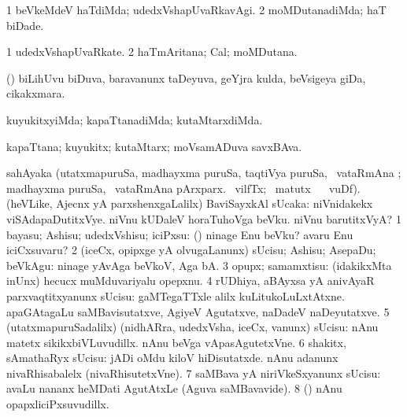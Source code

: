 {{{{{{\bentry
{}
  \gl{\kirxvi}\bmng
\bnum
\num{1} beVkeMdeV haTdiMda; udedxVshapUvaRkavAgi. 
\num{2} moMDutanadiMda; haT biDade. 
\enum
\emng
\eentry

\bentry
{}
  \gl{\nA}\bmng
\bnum
\num{1} udedxVshapUvaRkate. 
\num{2} haTmAritana; Cal; moMDutana. 
\enum
\emng
\eentry

\bentry
{} 
\gl{\nA}
\expl{}
\bmng
(\AseTxrXV) biLihUvu biDuva, baravanunx taDeyuva, geYjra kulda, beVsigeya giDa, cikakxmara. 
\emng
\eentry

\bentry
{}
  \gl{\kirxvi}\bmng
kuyukitxyiMda; kapaTtanadiMda; kutaMtarxdiMda. 
\emng
\eentry

\bentry
{}
  \gl{\nA}\bmng
kapaTtana; kuyukitx; kutaMtarx; moVsamADuva savxBAva. 
\emng
\eentry

\bentry
sahAyaka\gl{\kirx}
\bmng
(utatxmapuruSa, madhayxma puruSa, taqtiVya puruSa, \Eva\ vataRmAna ; madhayxma puruSa, \Eva\ vataRmAna pArxparx.  \ucAcx\ vilfTx; \BU\ matutx \BUkaq\  \ucAcx\ vuDf). (heVLike, Ajecnx yA parxshenxgaLalilx) BaviSayxkAl sUcaka:  niVnidakekx viSAdapaDutitxVye.  niVnu kUDaleV horaTuhoVga beVku.  niVnu barutitxVyA? 
\bnum
\num{1} bayasu; Ashisu; udedxVshisu; iciPxsu: (\pArxparx)  ninage Enu beVku?  avaru Enu iciCxsuvaru? 
\num{2} (iceCx, opipxge yA olvugaLanunx) sUcisu; Ashisu; AsepaDu; beVkAgu:  ninage yAvAga beVkoV, Aga bA. 
\num{3} opupx; samamxtisu:  (idakikxMta inUnx) hecucx muMduvariyalu opepxnu. 
\num{4} rUDhiya, aBAyxsa yA anivAyaR parxvaqtitxyanunx sUcisu:  gaMTegaTTxle alilx kuLitukoLuLxtAtxne.  apaGAtagaLu saMBavisutatxve, AgiyeV Agutatxve, naDadeV naDeyutatxve. 
\num{5} (utatxmapuruSadalilx) (nidhARra, udedxVsha, iceCx, \mo vanunx) sUcisu:  nAnu matetx sikikxbiVLuvudillx.  nAnu beVga vApasAgutetxVne. 
\num{6} shakitx, sAmathaRyx sUcisu:  jADi oMdu kiloV hiDisutatxde.  nAnu adanunx nivaRhisabalelx (nivaRhisutetxVne). 
\num{7} saMBava yA niriVkeSxyanunx sUcisu:  avaLu nananx heMDati AgutAtxLe (Aguva saMBavavide). 
\num{8} (\AmA)  nAnu opapxliciPxsuvudillx. 
\enum
\emng

}}}}}}
